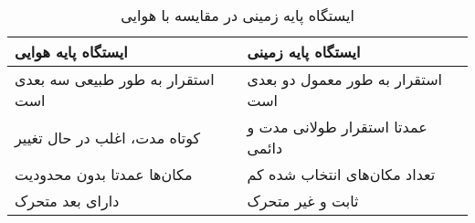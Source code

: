 \begin{table}[]\caption{ایستگاه پایه زمینی در مقایسه با هوایی}\label{Table3}
	\begin{tabular}{ll}
		\hline
		ایستگاه پایه هوایی & ایستگاه پایه زمینی \\ \hline
		استقرار به طور طبیعی سه بعدی است & استقرار به طور معمول دو بعدی است \\ 
		کوتاه مدت، اغلب در حال تغییر & عمدتا استقرار طولانی مدت و دائمی \\ 
		مکان‌ها عمدتا بدون محدودیت & تعداد مکان‌های انتخاب شده کم \\ 
		دارای بعد متحرک & ثابت و غیر متحرک \\ \hline
		
	\end{tabular}
	
\end{table}